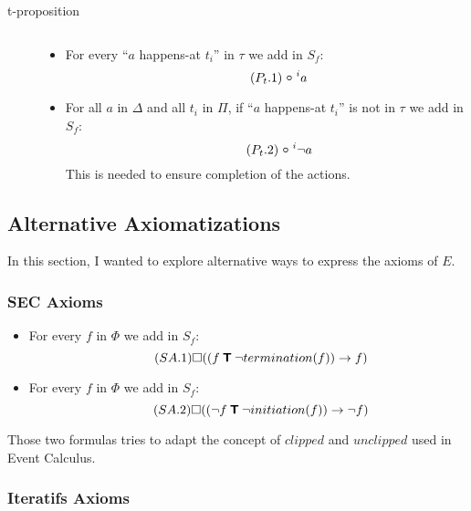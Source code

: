 \begin{description}
\begin{itemize}
\begin{equation}
    \end{equation}
  \end{itemize}
  \item[t-proposition] $ $
  \begin{itemize}
    \item For every “$a$ happens-at $t_i$” in $\tau$ we add in $S_f$:
    \begin{equation}\tag{$P_t.1$}
      \next^{i}a
    \end{equation}\label{sec:trans_def_ltl}
    \item For all $a$ in $\Delta$ and all $t_i$ in $\Pi$, if “$a$ happens-at $t_i$” is not in $\tau$ we add in $S_f$:
    \begin{equation}\tag{$P_t.2$}
      \next^{i}\neg a
    \end{equation}
      This is needed to ensure completion of the actions.
  \end{itemize}
\end{description}

\subsection{Alternative Axiomatizations}

In this section, I wanted to explore alternative ways to express the axioms of $E$.

\subsubsection{SEC Axioms}\label{sec:sec}

\begin{itemize}
  \item
    For every $f$ in $\Phi$ we add in $S_f$:
    \begin{equation}\tag{$SA.1$}
      \square((f \mathbin{\bm{\mathsf{T}}} \neg termination(f)) \rightarrow f)
    \end{equation}
  \item
    For every $f$ in $\Phi$ we add in $S_f$:
    \begin{equation}\tag{$SA.2$}
      \square((\neg f \mathbin{\bm{\mathsf{T}}} \neg initiation(f)) \rightarrow \neg f)
    \end{equation}
\end{itemize}

Those two formulas tries to adapt the concept of $clipped$ and $unclipped$ used in Event Calculus.

\subsubsection{Iteratifs Axioms}

